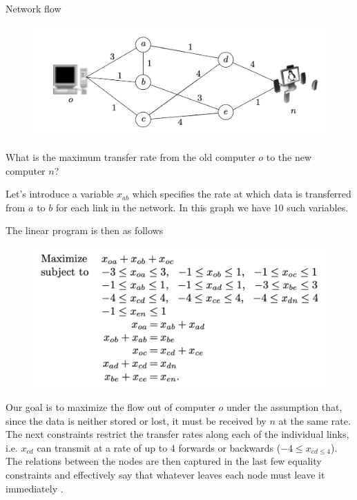\documentclass[../notes.tex]{subfiles}
\begin{document}
\begin{example}
    Network flow
    \begin{figure}[H]
        \centering
        \includegraphics[width=0.8\linewidth]{img/image_2023-03-08-16-40-21.png}
    \end{figure}

    What is the maximum transfer rate from the old computer $ o $ to the new computer $ n $?

    Let's introduce a variable $ x_{ab} $ which specifies the rate at which data is transferred from $ a  $ to $ b $ for each link in the network. In this graph we have 10 such variables.

    The linear program is then as follows

    \begin{figure}[H]
        \centering
        \includegraphics[width=0.8\linewidth]{img/image_2023-03-08-16-42-20.png}
    \end{figure}

    Our goal is to maximize the flow out of computer $ o $ under the assumption that, since the data is neither stored or lost, it must be received by $ n $ at the same rate.
    The next constraints restrict the transfer rates along each of the individual links, i.e. $ x_{cd} $ can transmit at a rate of up to $ 4  $ forwards or backwards ($ -4 \le  x_{cd \le  4}$).
    The relations between the nodes are then captured in the last few equality constraints and effectively say that whatever leaves each node must leave it immediately .


\end{example}
\end{document}
